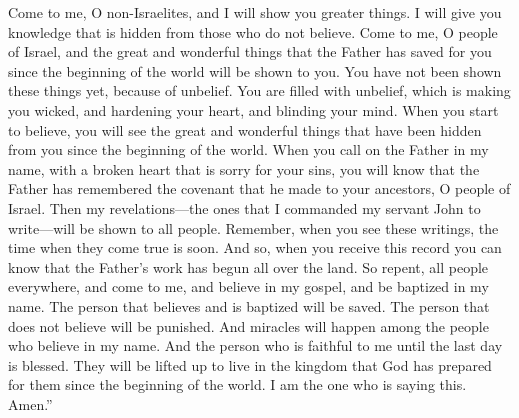 Come to me, O non-Israelites, and I will show you greater things. I will give you knowledge that is hidden from those who do not believe.
\bverse \iffalse Come unto me, O ye house of Israel, and it shall be made manifest unto you how great things the Father hath laid up for you, from the foundation of the world; and it hath not come unto you, because of unbelief. \fi
Come to me, O people of Israel, and the great and wonderful things that the Father has saved for you since the beginning of the world will be shown to you. You have not been shown these things yet, because of unbelief.
\bverse \iffalse Behold, when ye shall rend that veil of unbelief which doth cause you to remain in your awful state of wickedness, and hardness of heart, and blindness of mind, then shall the great and marvelous things which have been hid up from the foundation of the world from you--yea, when ye shall call upon the Father in my name, with a broken heart and a contrite spirit, then shall ye know that the Father hath remembered the covenant which he made unto your fathers, O house of Israel. \fi
You are filled with unbelief, which is making you wicked, and hardening your heart, and blinding your mind. When you start to believe, you will see the great and wonderful things that have been hidden from you since the beginning of the world. When you call on the Father in my name, with a broken heart that is sorry for your sins, you will know that the Father has remembered the covenant that he made to your ancestors, O people of Israel.
\bverse \iffalse And then shall my revelations which I have caused to be written by my servant John be unfolded in the eyes of all the people. Remember, when ye see these things, ye shall know that the time is at hand that they shall be made manifest in very deed. \fi
Then my revelations---the ones that I commanded my servant John to write---will be shown to all people. Remember, when you see these writings, the time when they come true is soon.
\bverse \iffalse Therefore, when ye shall receive this record ye may know that the work of the Father has commenced upon all the face of the land. \fi
And so, when you receive this record you can know that the Father's work has begun all over the land.
\bverse \iffalse Therefore, repent all ye ends of the earth, and come unto me, and believe in my gospel, and be baptized in my name; for he that believeth and is baptized shall be saved; but he that believeth not shall be damned; and signs shall follow them that believe in my name. \fi
So repent, all people everywhere, and come to me, and believe in my gospel, and be baptized in my name. The person that believes and is baptized will be saved. The person that does not believe will be punished. And miracles will happen among the people who believe in my name.
\bverse \iffalse And blessed is he that is found faithful unto my name at the last day, for he shall be lifted up to dwell in the kingdom prepared for him from the foundation of the world. And behold it is I that hath spoken it. Amen. \fi
And the person who is faithful to me until the last day is blessed. They will be lifted up to live in the kingdom that God has prepared for them since the beginning of the world. I am the one who is saying this. Amen.''

